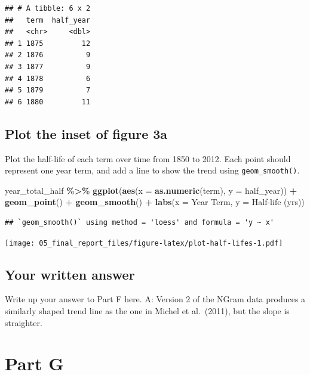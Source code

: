 \documentclass[
]{article}
\newenvironment{Shaded}{\begin{snugshade}}{\end{snugshade}}
\newcommand{\AttributeTok}[1]{\textcolor[rgb]{0.13,0.29,0.53}{#1}}
\newcommand{\FunctionTok}[1]{\textcolor[rgb]{0.13,0.29,0.53}{\textbf{#1}}}
\newcommand{\NormalTok}[1]{#1}
\newcommand{\SpecialCharTok}[1]{\textcolor[rgb]{0.81,0.36,0.00}{\textbf{#1}}}
\newcommand{\StringTok}[1]{\textcolor[rgb]{0.31,0.60,0.02}{#1}}
\begin{document}
\begin{verbatim}
## # A tibble: 6 x 2
##   term  half_year
##   <chr>     <dbl>
## 1 1875         12
## 2 1876          9
## 3 1877          9
## 4 1878          6
## 5 1879          7
## 6 1880         11
\end{verbatim}

\hypertarget{plot-the-inset-of-figure-3a}{%
\subsection{Plot the inset of figure
3a}\label{plot-the-inset-of-figure-3a}}

Plot the half-life of each term over time from 1850 to 2012. Each point
should represent one year term, and add a line to show the trend using
\texttt{geom\_smooth()}.

\begin{Shaded}
\begin{Highlighting}[]
\NormalTok{year\_total\_half }\SpecialCharTok{\%\textgreater{}\%} 
  \FunctionTok{ggplot}\NormalTok{(}\FunctionTok{aes}\NormalTok{(}\AttributeTok{x =} \FunctionTok{as.numeric}\NormalTok{(term), }\AttributeTok{y =}\NormalTok{ half\_year)) }\SpecialCharTok{+}
  \FunctionTok{geom\_point}\NormalTok{() }\SpecialCharTok{+}
  \FunctionTok{geom\_smooth}\NormalTok{() }\SpecialCharTok{+}
  \FunctionTok{labs}\NormalTok{(}\AttributeTok{x =} \StringTok{\textquotesingle{}Year Term\textquotesingle{}}\NormalTok{, }\AttributeTok{y =} \StringTok{\textquotesingle{}Half{-}life (yrs)\textquotesingle{}}\NormalTok{)}
\end{Highlighting}
\end{Shaded}

\begin{verbatim}
## `geom_smooth()` using method = 'loess' and formula = 'y ~ x'
\end{verbatim}

\texttt{[image: 05\_final\_report\_files/figure-latex/plot-half-lifes-1.pdf]}

\hypertarget{your-written-answer-4}{%
\subsection{Your written answer}\label{your-written-answer-4}}

Write up your answer to Part F here. A: Version 2 of the NGram data
produces a similarly shaped trend line as the one in Michel et
al.~(2011), but the slope is straighter.

\hypertarget{part-g}{%
\section{Part G}\label{part-g}}
\end{document}
